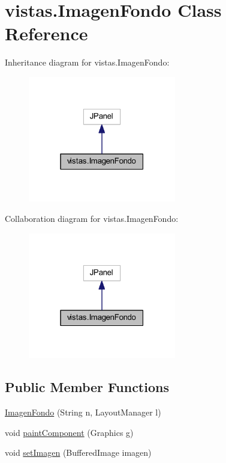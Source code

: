 \hypertarget{classvistas_1_1_imagen_fondo}{}\section{vistas.\+Imagen\+Fondo Class Reference}
\label{classvistas_1_1_imagen_fondo}


Inheritance diagram for vistas.\+Imagen\+Fondo\+:
\nopagebreak
\begin{figure}[H]
\begin{center}
\leavevmode
\includegraphics[width=183pt]{classvistas_1_1_imagen_fondo__inherit__graph}
\end{center}
\end{figure}


Collaboration diagram for vistas.\+Imagen\+Fondo\+:
\nopagebreak
\begin{figure}[H]
\begin{center}
\leavevmode
\includegraphics[width=183pt]{classvistas_1_1_imagen_fondo__coll__graph}
\end{center}
\end{figure}
\subsection*{Public Member Functions}
\begin{DoxyCompactItemize}
\item 
\mbox{\hyperlink{classvistas_1_1_imagen_fondo_aece725ff4c487d251cc412842f22d70b}{Imagen\+Fondo}} (String n, Layout\+Manager l)
\item 
void \mbox{\hyperlink{classvistas_1_1_imagen_fondo_a6429d71100efc5595b1c4c5523126721}{paint\+Component}} (Graphics g)
\item 
void \mbox{\hyperlink{classvistas_1_1_imagen_fondo_a005d3ae967e1ff7f995d6d50d7c1d17f}{set\+Imagen}} (Buffered\+Image imagen)
\end{DoxyCompactItemize}


